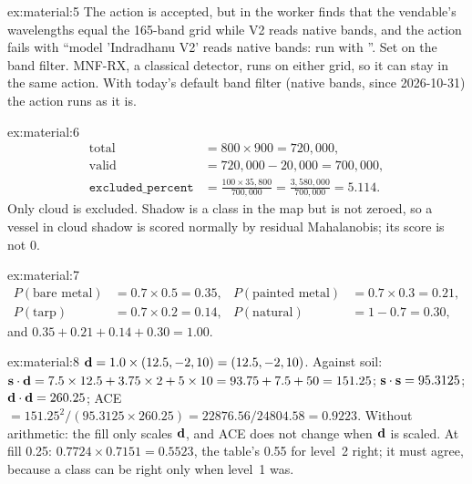 \begin{solution}{ex:material:5}
The action is accepted, but in the worker  finds that the vendable's wavelengths equal
the 165-band grid while V2 reads native bands, and the action fails with ``model 'Indradhanu V2' reads native
bands: run  with ''. Set
 on the band filter. MNF-RX, a classical detector, runs on either
grid, so it can stay in the same action. With today's default band filter (native bands, since 2026-10-31) the
action runs as it is.
\end{solution}

\begin{solution}{ex:material:6}
\begin{align*}
\text{total} &= 800\times900 = 720{,}000,\\
\text{valid} &= 720{,}000-20{,}000 = 700{,}000,\\
\texttt{excluded\_percent} &= \frac{100\times35{,}800}{700{,}000} = \frac{3{,}580{,}000}{700{,}000} = 5.114.
\end{align*}
Only cloud is excluded. Shadow is a class in the map but is not zeroed, so a vessel in cloud shadow is scored
normally by residual Mahalanobis; its score is not 0.
\end{solution}

\begin{solution}{ex:material:7}
\begin{align*}
P(\text{bare metal}) &= 0.7\times0.5=0.35, & P(\text{painted metal}) &= 0.7\times0.3=0.21,\\
P(\text{tarp}) &= 0.7\times0.2=0.14, & P(\text{natural}) &= 1-0.7=0.30,
\end{align*}
and $0.35+0.21+0.14+0.30=1.00$.
\end{solution}

\begin{solution}{ex:material:8}
$\mathbf{d}=1.0\times(12.5,-2,10)=(12.5,-2,10)$. Against soil: $\mathbf{s}\cdot\mathbf{d}=7.5\times12.5+3.75\times2+5\times10
=93.75+7.5+50=151.25$; $\mathbf{s}\cdot\mathbf{s}=95.3125$; $\mathbf{d}\cdot\mathbf{d}=260.25$; ACE
$=151.25^2/(95.3125\times260.25)=22876.56/24804.58=0.9223$. Without arithmetic: the fill only scales $\mathbf{d}$, and
ACE does not change when $\mathbf{d}$ is scaled. At fill 0.25: $0.7724\times0.7151=0.5523$, the table's 0.55 for level~2
right; it must agree, because a class can be right only when level~1 was.
\end{solution}

